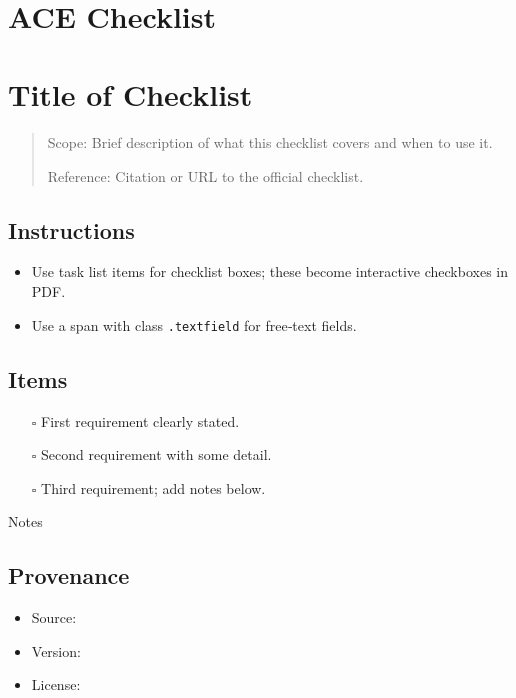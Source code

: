 \documentclass[11pt]{article}
\def\tightlist{}
\begin{document}
\begin{center}
{\LARGE }\\[4pt]
\normalsize 
\end{center}
\vspace{1em}

\begin{Form}

\section{ACE Checklist}\label{ace-checklist}

\section{Title of Checklist}\label{title-of-checklist}

\begin{quote}
Scope: Brief description of what this checklist covers and when to use
it.

Reference: Citation or URL to the official checklist.
\end{quote}

\subsection{Instructions}\label{instructions}

\begin{itemize}
\tightlist
\item
  Use task list items for checklist boxes; these become interactive
  checkboxes in PDF.
\item
  Use a span with class \texttt{.textfield} for free‑text fields.
\end{itemize}

\subsection{Items}\label{items}

\begin{itemize}
\tightlist
\item[$\square$]
  First requirement clearly stated.
\item[$\square$]
  Second requirement with some detail.
\item[$\square$]
  Third requirement; add notes below.
\end{itemize}

{Notes}

\subsection{Provenance}\label{provenance}

\begin{itemize}
\tightlist
\item
  Source:
\item
  Version:
\item
  License:
\end{itemize}

\end{Form}
\end{document}
